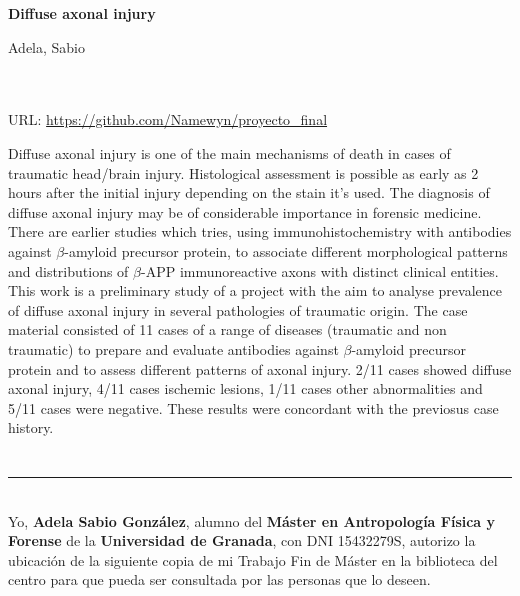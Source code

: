 \thispagestyle{empty}


\begin{center}
{\large\bfseries Diffuse axonal injury}\\
\end{center}
\begin{center}
Adela, Sabio\\
\end{center}

\\

\vspace{0.7cm}
\\

URL: \url{https://github.com/Namewyn/proyecto_final}

Diffuse axonal injury is one of the main mechanisms of death in cases of traumatic head/brain injury. Histological assessment is possible as early as 2 hours after the initial injury depending on the stain it’s used. The diagnosis of diffuse axonal injury may be of considerable importance in forensic medicine. There are earlier studies which tries, using immunohistochemistry with antibodies against $\beta$-amyloid precursor protein, to associate different morphological patterns and distributions of $\beta$-APP immunoreactive axons with distinct clinical entities. This work is a preliminary study of a project with the aim to analyse prevalence of diffuse axonal injury in several pathologies of traumatic origin. The case material consisted of 11 cases of a range of diseases (traumatic and non traumatic) to prepare and evaluate antibodies against $\beta$-amyloid precursor protein and to assess different patterns of axonal injury. 2/11 cases showed diffuse axonal injury, 4/11 cases ischemic lesions, 1/11 cases other abnormalities and 5/11 cases were negative. These results were concordant with the previosus case history.

\chapter*{}
\thispagestyle{empty}

\noindent\rule[-1ex]{\textwidth}{2pt}\\[4.5ex]

Yo, \textbf{Adela Sabio González}, alumno del \textbf{Máster en Antropología Física y Forense} de la \textbf{Universidad de Granada}, con DNI 15432279S, autorizo la
ubicación de la siguiente copia de mi Trabajo Fin de Máster en la biblioteca del centro para que pueda ser
consultada por las personas que lo deseen.

